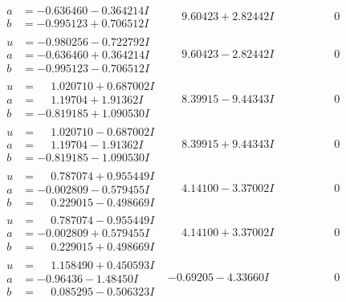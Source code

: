 \documentclass[1p]{elsarticle_modified}
\theoremstyle{definition}
\begin{document}
$$\begin{array}{c|c|c}
\begin{aligned}
a &= -0.636460 - 0.364214 I \\
b &= -0.995123 + 0.706512 I\end{aligned}
 & \phantom{-}9.60423 + 2.82442 I & \phantom{-0.000000 } 0 \\ \hline\begin{aligned}
u &= -0.980256 - 0.722792 I \\
a &= -0.636460 + 0.364214 I \\
b &= -0.995123 - 0.706512 I\end{aligned}
 & \phantom{-}9.60423 - 2.82442 I & \phantom{-0.000000 } 0 \\ \hline\begin{aligned}
u &= \phantom{-}1.020710 + 0.687002 I \\
a &= \phantom{-}1.19704 + 1.91362 I \\
b &= -0.819185 + 1.090530 I\end{aligned}
 & \phantom{-}8.39915 - 9.44343 I & \phantom{-0.000000 } 0 \\ \hline\begin{aligned}
u &= \phantom{-}1.020710 - 0.687002 I \\
a &= \phantom{-}1.19704 - 1.91362 I \\
b &= -0.819185 - 1.090530 I\end{aligned}
 & \phantom{-}8.39915 + 9.44343 I & \phantom{-0.000000 } 0 \\ \hline\begin{aligned}
u &= \phantom{-}0.787074 + 0.955449 I \\
a &= -0.002809 - 0.579455 I \\
b &= \phantom{-}0.229015 - 0.498669 I\end{aligned}
 & \phantom{-}4.14100 - 3.37002 I & \phantom{-0.000000 } 0 \\ \hline\begin{aligned}
u &= \phantom{-}0.787074 - 0.955449 I \\
a &= -0.002809 + 0.579455 I \\
b &= \phantom{-}0.229015 + 0.498669 I\end{aligned}
 & \phantom{-}4.14100 + 3.37002 I & \phantom{-0.000000 } 0 \\ \hline\begin{aligned}
u &= \phantom{-}1.158490 + 0.450593 I \\
a &= -0.96436 - 1.48450 I \\
b &= \phantom{-}0.085295 - 0.506323 I\end{aligned}
 & -0.69205 - 4.33660 I & \phantom{-0.000000 } 0 \\ \hline\begin{aligned}

\end{aligned}
\end{array}$$
\end{document}
